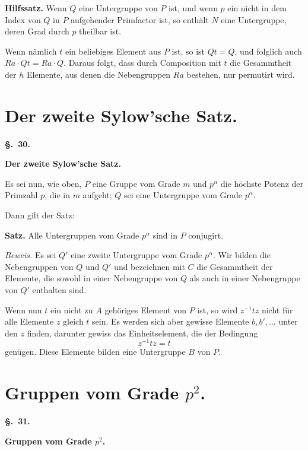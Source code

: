 \documentclass[12pt,a4paper]{article}
\begin{document}
\medskip
\noindent\textbf{Hilfssatz.} Wenn $Q$ eine Untergruppe von $P$ ist, und
wenn $p$ ein nicht in dem Index von $Q$ in $P$
aufgehender Primfactor ist, so enth\"alt $N$ eine
Untergruppe, deren Grad durch $p$ theilbar ist.

Wenn n\"amlich $t$ ein beliebiges Element aus $P$ ist, so ist
$Qt = Q$, und folglich auch $Ra \cdot Qt = Ra \cdot Q$. Daraus folgt, dass
durch Composition mit $t$ die Gesammtheit der $h$ Elemente, aus denen
die Nebengruppen $Ra$ bestehen, nur permutirt wird.

\newpage
\section{Der zweite Sylow'sche Satz.}
\label{sec:30}

\begin{center}\textbf{\S.~30.}\end{center}
\begin{center}\large\bfseries Der zweite Sylow'sche Satz.\end{center}

Es sei nun, wie oben, $P$ eine Gruppe vom Grade $m$ und
$p^\alpha$ die h\"ochste Potenz der Primzahl $p$, die in $m$ aufgeht; $Q$ sei
eine Untergruppe vom Grade $p^\alpha$.

Dann gilt der Satz:

\medskip
\noindent\textbf{Satz.} Alle Untergruppen vom Grade $p^\alpha$ sind in $P$
conjugirt.

\medskip
\noindent\textit{Beweis.} Es sei $Q'$ eine zweite Untergruppe vom Grade
$p^\alpha$. Wir bilden die Nebengruppen von $Q$ und $Q'$ und
bezeichnen mit $C$ die Gesammtheit der Elemente, die sowohl
in einer Nebengruppe von $Q$ als auch in einer Nebengruppe
von $Q'$ enthalten sind.

Wenn nun $t$ ein nicht zu $A$ geh\"origes Element von $P$ ist,
so wird $z^{-1}tz$ nicht f\"ur alle Elemente $z$ gleich $t$ sein. Es
werden sich aber gewisse Elemente $b, b', \ldots$ unter den $z$ finden,
darunter gewiss das Einheitselement, die der Bedingung
\[z^{-1}tz = t\]
gen\"ugen. Diese Elemente bilden eine Untergruppe $B$ von $P$.

\newpage
\section{Gruppen vom Grade $p^2$.}
\label{sec:31}

\begin{center}\textbf{\S.~31.}\end{center}
\begin{center}\large\bfseries Gruppen vom Grade $p^2$.\end{center}
\end{document}
